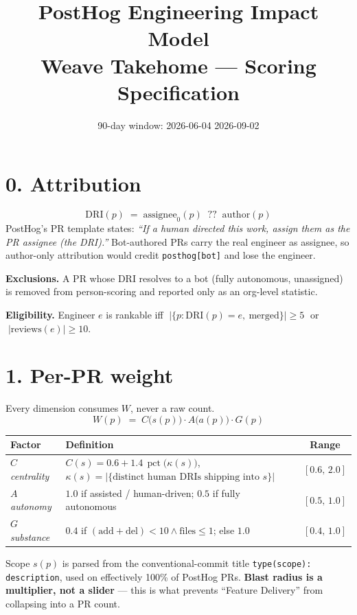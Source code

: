 \documentclass[11pt]{article}
\title{\textbf{PostHog Engineering Impact Model}\\[2pt]\large Weave Takehome --- Scoring Specification}
\author{}
\date{90-day window: 2026-06-04 \textendash{} 2026-09-02}
\newcommand{\pct}{\operatorname{pct}}
\begin{document}
\maketitle
\vspace{-2.2em}

\section*{0. Attribution}
\[ \mathrm{DRI}(p) \;=\; \mathrm{assignee}_0(p)\;\;??\;\;\mathrm{author}(p) \]
PostHog's PR template states: \emph{``If a human directed this work, assign them as the PR assignee (the DRI).''}
Bot-authored PRs carry the real engineer as assignee, so author-only attribution would credit
\texttt{posthog[bot]} and lose the engineer.

\textbf{Exclusions.} A PR whose DRI resolves to a bot (fully autonomous, unassigned) is removed from
person-scoring and reported only as an org-level statistic.

\textbf{Eligibility.} Engineer $e$ is rankable iff
$\;|\{p : \mathrm{DRI}(p)=e,\ \text{merged}\}| \ge 5\;$ or $\;|\mathrm{reviews}(e)| \ge 10$.

\section*{1. Per-PR weight}
Every dimension consumes $W$, never a raw count.
\[ W(p) \;=\; C\big(s(p)\big)\cdot A\big(a(p)\big)\cdot G(p) \]

\begin{tabular}{@{}llc@{}}
\toprule
\textbf{Factor} & \textbf{Definition} & \textbf{Range}\\
\midrule
$C$ \emph{centrality} & $C(s)=0.6+1.4\,\pct\!\big(\kappa(s)\big)$, \; $\kappa(s)=|\{\text{distinct human DRIs shipping into } s\}|$ & $[0.6,\,2.0]$\\
$A$ \emph{autonomy} & $1.0$ if assisted / human-driven; \; $0.5$ if fully autonomous & $[0.5,\,1.0]$\\
$G$ \emph{substance} & $0.4$ if $(\mathrm{add}+\mathrm{del})<10 \wedge \mathrm{files}\le 1$; else $1.0$ & $[0.4,\,1.0]$\\
\bottomrule
\end{tabular}

\medskip
\noindent Scope $s(p)$ is parsed from the conventional-commit title \texttt{type(scope): description},
used on effectively 100\% of PostHog PRs. \textbf{Blast radius is a multiplier, not a slider} --- this is
what prevents ``Feature Delivery'' from collapsing into a PR count.
\end{document}
